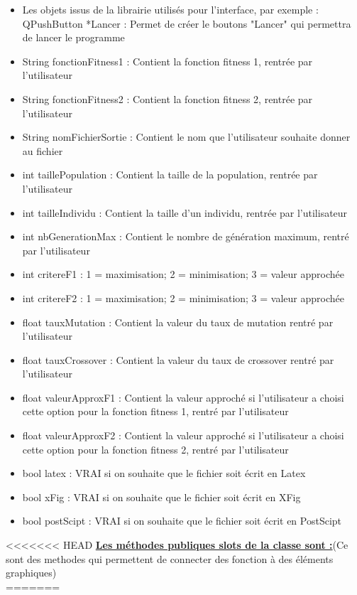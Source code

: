 \documentclass[a4paper,11pt]{article}
\begin{document}
				\begin{itemize}
				\item Les objets issus de la librairie utilisés pour l'interface, par exemple :\\
					QPushButton *Lancer : Permet de créer le boutons "Lancer" qui permettra de lancer le programme\vspace{0.2cm}
				\item String fonctionFitness1 : Contient la fonction fitness 1, rentrée par l'utilisateur
				\item String fonctionFitness2 : Contient la fonction fitness 2, rentrée par l'utilisateur
				\item String nomFichierSortie : Contient le nom que l'utilisateur souhaite donner au fichier
				\item int taillePopulation : Contient la taille de la population, rentrée par l'utilisateur
				\item int tailleIndividu : Contient la taille d'un individu, rentrée par l'utilisateur
				\item int nbGenerationMax : Contient le nombre de génération maximum, rentré par l'utilisateur
				\item int critereF1 : 1  = maximisation; 2 = minimisation; 3 = valeur approchée
				\item int critereF2 : 1  = maximisation; 2 = minimisation; 3 = valeur approchée
				\item float tauxMutation : Contient la valeur du taux de mutation rentré par l'utilisateur
				\item float tauxCrossover : Contient la valeur du taux de crossover rentré par l'utilisateur
				\item float valeurApproxF1 : Contient la valeur approché si l'utilisateur a choisi cette option pour la fonction fitness 1, rentré par l'utilisateur
				\item float valeurApproxF2 : Contient la valeur approché si l'utilisateur a choisi cette option pour la fonction fitness 2, rentré par l'utilisateur
				\item bool latex : VRAI si on souhaite que le fichier soit écrit en Latex
				\item bool xFig : VRAI si on souhaite que le fichier soit écrit en XFig
				\item bool postScipt : VRAI si on souhaite que le fichier soit écrit en PostScipt\\
			\end{itemize}
<<<<<<< HEAD
			\underline{\bf Les méthodes publiques slots de la classe sont :}(Ce sont des methodes qui permettent de connecter des fonction à des éléments graphiques)\\
=======
\end{document}
